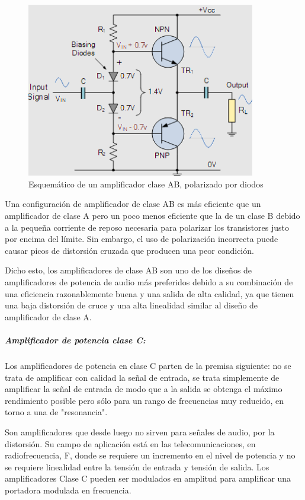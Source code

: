 \begin{figure}[H]
    \centering
    \includegraphics[width=10cm]{Imagenes/clase_ab.png}
    \caption{Esquemático de un amplificador clase AB, polarizado por diodos }
    \label{fig:clase_ab}
\end{figure}

Una configuración de amplificador de clase AB es más eficiente que un amplificador de clase A pero un poco menos eficiente que la de un clase B debido a la pequeña corriente de reposo necesaria para polarizar los transistores justo por encima del límite. Sin embargo, el uso de polarización incorrecta puede causar picos de distorsión cruzada que producen una peor condición.

Dicho esto, los amplificadores de clase AB son uno de los diseños de amplificadores de potencia de audio más preferidos debido a su combinación de una eficiencia razonablemente buena y una salida de alta calidad, ya que tienen una baja distorsión de cruce y una alta linealidad similar al diseño de amplificador de clase A.

\subparagraph{Amplificador de potencia clase C:}

Los amplificadores de potencia en clase C parten de la premisa siguiente: no se trata de amplificar con calidad la señal de entrada, se trata simplemente de amplificar la señal de entrada de modo que a la salida se obtenga el máximo rendimiento posible pero sólo para un rango de frecuencias muy reducido, en torno a una de "resonancia".

Son amplificadores que desde luego no sirven para señales de audio, por la distorsión. Su campo de aplicación está en las telecomunicaciones, en radiofrecuencia, F, donde se requiere un incremento en el nivel de potencia y no se requiere linealidad entre la tensión de entrada y tensión de salida. Los amplificadores Clase C pueden ser modulados en amplitud para amplificar una portadora modulada en frecuencia.

